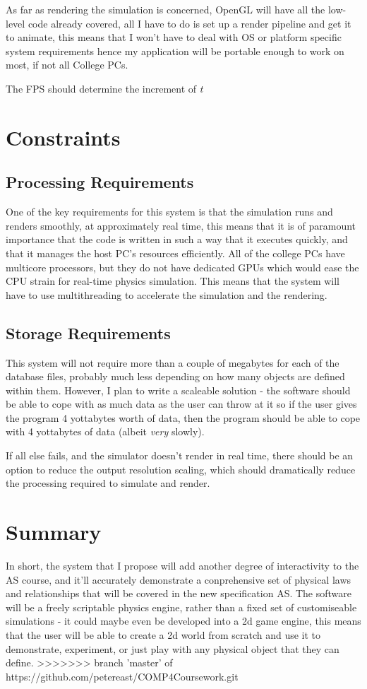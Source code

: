 	As far as rendering the simulation is concerned, OpenGL will have all the low-level code already covered, all I have to do is set up a render pipeline and get it to animate, this means that I won't have to deal with OS or platform specific system requirements hence my application will be portable enough to work on most, if not all College PCs.

		The FPS should determine the increment of \textit{t}


\section{Constraints}
		\subsection{Processing Requirements}
			One of the key requirements for this system is that the simulation runs and renders smoothly, at approximately real time, this means that it is of paramount importance that the code is written in such a way that it executes quickly, and that it manages the host PC's resources efficiently. All of the college PCs have multicore processors, but they do not have dedicated GPUs which would ease the CPU strain for real-time physics simulation. This means that the system will have to use multithreading to accelerate the simulation and the rendering.
		\subsection{Storage Requirements}
			This system will not require more than a couple of megabytes for each of the database files, probably much less depending on how many objects are defined within them. However, I plan to write a scaleable solution - the software should be able to cope with as much data as the user can throw at it so if the user gives the program 4 yottabytes worth of data, then the program should be able to cope with 4 yottabytes of data (albeit \textit{very} slowly).

	If all else fails, and the simulator doesn't render in real time, there should be an option to reduce the output resolution scaling, which should dramatically reduce the processing required to simulate and render.


\section{Summary}
In short, the system that I propose will add another degree of interactivity to the AS course, and it'll accurately demonstrate a conprehensive set of physical laws and relationships that will be covered in the new specification AS. The software will be a freely scriptable physics engine, rather than a fixed set of customiseable simulations - it could maybe even be developed into a 2d game engine, this means that the user will be able to create a 2d world from scratch and use it to demonstrate, experiment, or just play with any physical object that they can define.
>>>>>>> branch 'master' of https://github.com/petereast/COMP4Coursework.git
